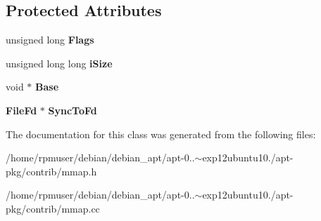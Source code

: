 \subsection*{\-Protected \-Attributes}
\begin{DoxyCompactItemize}
\item 
unsigned long {\bfseries \-Flags}\label{classMMap_a15eb852dd5568416ca012c6dcbff021b}

\item 
unsigned long long {\bfseries i\-Size}\label{classMMap_a7c1c34236f840245f42babe60ec41bb8}

\item 
void $\ast$ {\bfseries \-Base}\label{classMMap_accdd444e1dcba9a8ab17b65d51f12771}

\item 
{\bf \-File\-Fd} $\ast$ {\bfseries \-Sync\-To\-Fd}\label{classMMap_a6de0b37236933b43702cb3a24d0748c6}

\end{DoxyCompactItemize}


\-The documentation for this class was generated from the following files\-:\begin{DoxyCompactItemize}
\item 
/home/rpmuser/debian/debian\-\_\-apt/apt-\/0..$\sim$exp12ubuntu10./apt-\/pkg/contrib/mmap.\-h\item 
/home/rpmuser/debian/debian\-\_\-apt/apt-\/0..$\sim$exp12ubuntu10./apt-\/pkg/contrib/mmap.\-cc\end{DoxyCompactItemize}
